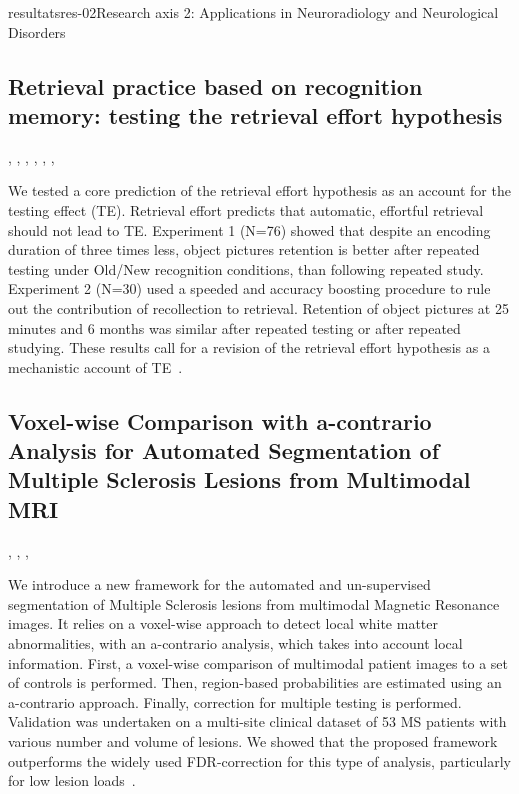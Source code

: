 \documentclass{ra2018}
\begin{document}
\begin{module}{resultats}{res-02}{Research axis 2: Applications in Neuroradiology and Neurological Disorders}
\subsection{Retrieval practice based on recognition memory: testing the retrieval effort hypothesis}
\begin{participants}
      , 
      ,
      ,
      ,
      ,
      ,
\end{participants}
We tested a core prediction of the retrieval effort hypothesis as an account for the testing effect (TE). Retrieval effort predicts that automatic, effortful retrieval should not lead to TE. Experiment 1 (N=76) showed that despite an encoding duration of three times less, object pictures retention is better after repeated testing under Old/New recognition conditions, than following repeated study. Experiment 2 (N=30) used a speeded and accuracy boosting procedure to rule out the contribution of recollection to retrieval. Retention of object pictures at 25 minutes and 6 months was similar after repeated testing or after repeated studying. These results call for a revision of the retrieval effort hypothesis as a mechanistic account of TE~\cite{jonin:inserm-01939069}.


\subsection{Voxel-wise Comparison with a-contrario Analysis for Automated Segmentation of Multiple Sclerosis Lesions from Multimodal MRI}
\begin{participants}
      ,
      ,
      ,
\end{participants}
We introduce a new framework for the automated and un-supervised segmentation of Multiple Sclerosis lesions from multimodal Magnetic Resonance images. It relies on a voxel-wise approach to detect local white matter abnormalities, with an a-contrario analysis, which takes into account local information. First, a voxel-wise comparison of multimodal patient images to a set of controls is performed. Then, region-based probabilities are estimated using an a-contrario approach. Finally, correction for multiple testing is performed. Validation was undertaken on a multi-site clinical dataset of 53 MS patients with various number and volume of lesions. We showed that the proposed framework outperforms the widely used FDR-correction for this type of analysis, particularly for low lesion loads~\cite{galassi:inserm-01888928}.


\end{module}
\end{document}
